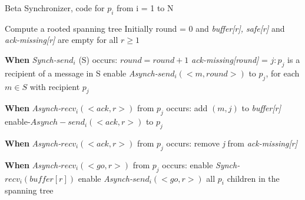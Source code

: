 \begin{algorithm}
 \caption{Beta Synchronizer, code for $p_i$ from i = 1 to N}
 \label{algorithm:beta} 

\SetAlgoNoLine

Compute a rooted spanning tree
Initially round = 0 and \newline
\textit{buffer[r], safe[r]} and \textit{ack-missing[r]} are empty for all $r \geq 1$ \newline

\textbf{When} \textit{Synch-}$send_i$ (S) occurs:\newline
$round = round + 1$ \newline
\textit{ack-missing[round]} = {$j:p_j$ is a recipient of a message in S} \newline
enable \textit{Asynch-}$send_i(<m,round>)$  to $p_j$, for each $m \in S$ with recipient $p_j$ \newline

\textbf{When} \textit{Asynch-}$recv_i(<ack,r>)$ from $p_j$ occurs: \newline
add $(m,j)$ to \textit{buffer[r]} \newline
enable-$Asynch-send_i(<ack,r>)$ to $p_j$ \newline

\textbf{When} \textit{Asynch-}$recv_i(<ack,r>)$ from $p_j$ occurs: \newline
remove \textit{j} from \textit{ack-missing[r]} \newline
{}

\textbf{When} \textit{Asynch-}$recv_i(<go,r>)$ from $p_j$ occurs: \newline
  enable \textit{Synch-}$recv_i(buffer[r])$ \newline
  enable \textit{Asynch-}$send_i(<go,r>)$ all $p_i$ children in the spanning tree \newline

\end{algorithm}
